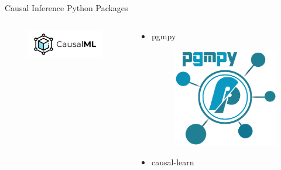 \documentclass[aspectratio=169]{beamer}
\begin{document}
\begin{frame}{Causal Inference Python Packages}
\begin{columns}
\begin{column}[T]{0.5 \textwidth}
\begin{itemize}
					\begin{figure}
						\includegraphics[scale=0.3]{imgs/causalml.png}
					\end{figure}
			\end{itemize}

		\end{column}
		\vrule
		\begin{column}[T]{0.5 \textwidth}
			\begin{itemize}
				\item pgmpy
					\begin{figure}
						\includegraphics[scale=0.15]{imgs/pgmpy.png}
					\end{figure}
				\item causal-learn
			\end{itemize}
		\end{column}
	\end{columns}
\end{frame}
\end{document}
